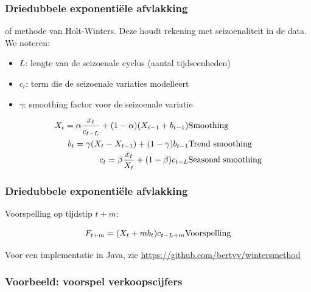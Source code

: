 \documentclass{beamer}
\begin{document}
\begin{frame}
  \frametitle{Driedubbele exponentiële afvlakking}

  of methode van Holt-Winters. Deze houdt rekening met seizoenaliteit in de data. We noteren:

  \begin{itemize}
    \item $L$: lengte van de seizoenale cyclus (aantal tijdseenheden)
    \item $c_t$: term die de seizoenale variaties modelleert
    \item $\gamma$: smoothing factor voor de seizoenale variatie
  \end{itemize}

\begin{eqnarray*}
	X_{t} = \alpha \frac{x_{t}}{c_{t-L}} + (1-\alpha) (X_{t-1} + b_{t-1}) & \textnormal{Smoothing}\\
	b_{t} = \gamma (X_{t} - X_{t-1}) + (1-\gamma)b_{t-1} & \textnormal{Trend smoothing} \\
	c_{t} = \beta \frac{x_{t}}{X_{t}} + (1-\beta)c_{t-L} & \textnormal{Seasonal smoothing} \\
\label{eq:HoltWinters}
\end{eqnarray*}

\end{frame}

\begin{frame}
  \frametitle{Driedubbele exponentiële afvlakking}

  Voorspelling op tijdstip $t + m$:

  \[ F_{t+m} = (X_{t} + mb_{t})c_{t-L+m}  \textnormal{Voorspelling}\]

  Voor een implementatie in Java, zie \url{https://github.com/bertvv/wintersmethod}
\end{frame}

\begin{frame}
  \frametitle{Voorbeeld: voorspel verkoopscijfers}

  \centering
\end{frame}
\end{document}
